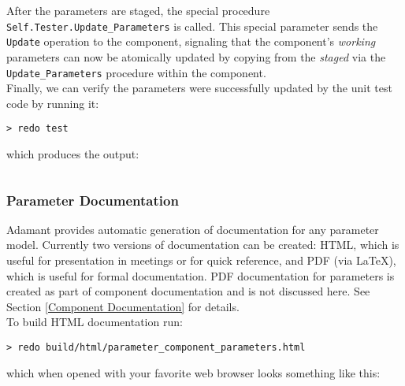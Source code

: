 After the parameters are staged, the special procedure \texttt{Self.Tester.Update\_Parameters} is called. This special parameter sends the \texttt{Update} operation to the component, signaling that the component's \textit{working} parameters can now be atomically updated by copying from the \textit{staged} via the \texttt{Update\_Parameters} procedure within the component. \\

Finally, we can verify the parameters were successfully updated by the unit test code by running it:

\vspace{5mm} %
\begin{verbatim}
> redo test
\end{verbatim}
\vspace{5mm} %

which produces the output:

\vspace{5mm} %
\inputminted{text}{../example_architecture/parameter_component/test/output.txt}
\vspace{5mm} %

\subsubsection{Parameter Documentation}

Adamant provides automatic generation of documentation for any parameter model. Currently two versions of documentation can be created: HTML, which is useful for presentation in meetings or for quick reference, and PDF (via \LaTeX), which is useful for formal documentation. PDF documentation for parameters is created as part of component documentation and is not discussed here. See Section \ref{Component Documentation} for details. \\

To build HTML documentation run:

\vspace{5mm} %
\begin{verbatim}
> redo build/html/parameter_component_parameters.html
\end{verbatim}
\vspace{5mm} %

which when opened with your favorite web browser looks something like this: \\

